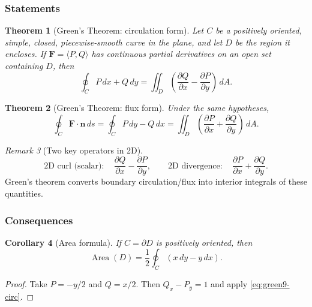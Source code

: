 \documentclass[12pt]{article}
\numberwithin{equation}{section}
\newcommand{\vect}[1]{\boldsymbol{#1}}   %
\theoremstyle{plain}
\newtheorem{theorem}{Theorem}[section]
\newtheorem{corollary}[theorem]{Corollary}
\theoremstyle{definition}
\theoremstyle{remark}
\newtheorem{remark}[theorem]{Remark}
\begin{document}
\subsubsection{Statements}

\begin{theorem}[Green's Theorem: circulation form]\label{thm:green9}
Let $C$ be a positively oriented, simple, closed, piecewise-smooth curve in the plane, and let $D$ be the region it encloses.  
If $\vect F=\langle P,Q\rangle$ has continuous partial derivatives on an open set containing $D$, then
\begin{equation}\label{eq:green9-circ}
\oint_C P\,dx+Q\,dy
=
\iint_D \left(\frac{\partial Q}{\partial x}-\frac{\partial P}{\partial y}\right)\,dA.
\end{equation}
\end{theorem}

\begin{theorem}[Green's Theorem: flux form]\label{thm:green9-flux}
Under the same hypotheses,
\begin{equation}\label{eq:green9-flux}
\oint_C \vect F\cdot \vect n\,ds
=
\oint_C P\,dy - Q\,dx
=
\iint_D \left(\frac{\partial P}{\partial x}+\frac{\partial Q}{\partial y}\right)\,dA.
\end{equation}
\end{theorem}

\begin{remark}[Two key operators in 2D]
\[
\text{2D curl (scalar)}:\quad \frac{\partial Q}{\partial x}-\frac{\partial P}{\partial y},
\qquad
\text{2D divergence}:\quad \frac{\partial P}{\partial x}+\frac{\partial Q}{\partial y}.
\]
Green's theorem converts boundary circulation/flux into interior integrals of these quantities.
\end{remark}

\subsubsection{Consequences}

\begin{corollary}[Area formula]\label{cor:area-green9}
If $C=\partial D$ is positively oriented, then
\begin{equation}\label{eq:area-green9}
\operatorname{Area}(D)=\frac12\oint_C (x\,dy-y\,dx).
\end{equation}
\end{corollary}

\begin{proof}
Take $P=-y/2$ and $Q=x/2$. Then $Q_x-P_y=1$ and apply \cref{eq:green9-circ}.
\end{proof}
\end{document}
